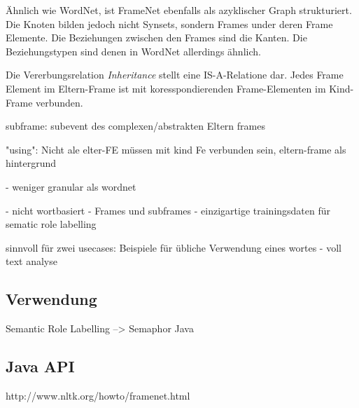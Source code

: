 Ähnlich wie WordNet, ist FrameNet ebenfalls als azyklischer Graph strukturiert. Die Knoten bilden jedoch nicht Synsets, sondern Frames under deren Frame Elemente. Die Beziehungen zwischen den Frames sind die Kanten. Die Beziehungstypen sind denen in WordNet allerdings ähnlich.

Die Vererbungsrelation \textit{Inheritance} stellt eine IS-A-Relatione dar. Jedes Frame Element im Eltern-Frame ist mit koresspondierenden Frame-Elementen im Kind-Frame verbunden.

subframe:
subevent des complexen/abstrakten Eltern frames

"using":
Nicht ale elter-FE müssen mit kind Fe verbunden sein, eltern-frame als hintergrund

- weniger granular als wordnet

- nicht wortbasiert
- Frames und subframes
- einzigartige trainingsdaten für sematic role labelling

sinnvoll für zwei usecases:
Beispiele für übliche Verwendung eines wortes
- voll text analyse


\subsection{Verwendung}
Semantic Role Labelling --> Semaphor Java


\subsection{Java API}



http://www.nltk.org/howto/framenet.html
 
 